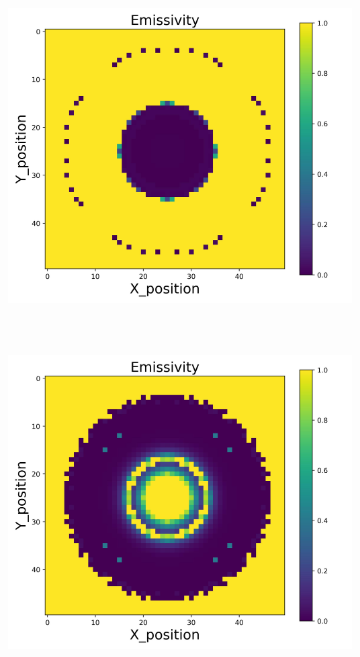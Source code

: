 {\begin{figure}[p]
\begin{minipage}{\textwidth}
\begin{subfigure}{0.325\textwidth}
        \end{subfigure}
        \begin{subfigure}{0.325\textwidth}
            \centering
            \includegraphics[width=\textwidth]{figures/raw_data/31/exp/emi_cal.jpg}
        \end{subfigure}
    \end{minipage}\\
    \begin{minipage}{\textwidth}
        \centering
        \begin{subfigure}{0.325\textwidth}
            \centering
            \includegraphics[width=\textwidth]{figures/raw_data/32/exp/emi_cal.jpg}

\end{subfigure}
\end{minipage}
\end{figure}}

